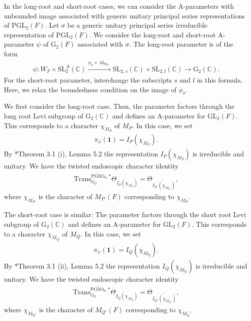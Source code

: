 \documentclass[12pt]{amsart}
\theoremstyle{definition}
\theoremstyle{plain}
\theoremstyle{remark}
\def\C{\mathbb{C}}%
\def\GL{\mathrm{GL}}
\def\PGL{\mathrm{PGL}}
\def\SL{\mathrm{SL}}
\def\PGSO{\mathrm{PGSO}}
\DeclareMathOperator{\id}{id}%
\numberwithin{equation}{section}
\newcommand{\rG}{\mathrm{G}}
\newcommand{\Trans}{\mathrm{Trans}}
\begin{document}
In the long-root and short-root cases, we can consider the A-parameters with unbounded image associated with generic unitary principal series representations of $\PGL_2(F)$.
Let $\sigma$ be a generic unitary principal series irreducible representation of $\PGL_2(F)$.
We consider the long-root and short-root A-parameter $\psi$ of $\rG_2(F)$ associated with $\sigma$.
The long-root parameter is of the form
\begin{align*}
      \psi \colon W_F \times \SL_2^A(\C) \xrightarrow{\phi_{\sigma} \times \id_{\SL_2}} \SL_{2, s}(\C) \times \SL_{2, l}(\C) \to \rG_2(\C).
\end{align*}
For the short-root parameter, interchange the subscripts $s$ and $l$
in this formula.
Here, we relax the boundedness condition on the image of $\phi_{\sigma}$.

We first consider the long-root case.
Then, the parameter factors through the long root Levi subgroup of $\rG_2(\C)$ and defines an A-parameter for $\GL_2(F)$.
This corresponds to a character $\chi_{M_P}$ of $M_P$.
In this case, we set 
\begin{align*}
      \pi_{\psi}(\mathbf{1}) = I_P(\chi_{M_P}).
\end{align*}
By \cite{Muic1997-UnitaryDualG2}*{Theorem 3.1 (i), Lemma 5.2} the representation $I_P(\chi_{M_P})$ is irreducible and unitary.
We have the twisted endoscopic character identity
\begin{align*}
      \Trans^{\widetilde{\PGSO_8}, *}_{\rG_2} \Theta_{I_P(\chi_{M_P})} = \Theta_{\widetilde{I_{P'}(\chi_{M_{P'}})}},
\end{align*}
where $\chi_{M_{P'}}$ is the character of $M_{P'}(F)$ corresponding to $\chi_{M_P}$.

The short-root case is similar:
The parameter factors through the short root Levi subgroup of $\rG_2(\C)$ and defines an A-parameter for $\GL_2(F)$.
This corresponds to a character $\chi_{M_Q}$ of $M_Q$.
In this case, we set
\begin{align*}
      \pi_{\psi}(\mathbf{1}) = I_Q(\chi_{M_Q}).
\end{align*}
By \cite{Muic1997-UnitaryDualG2}*{Theorem 3.1 (ii), Lemma 5.2} the representation $I_Q(\chi_{M_Q})$ is irreducible and unitary.
We have the twisted endoscopic character identity
\begin{align*}
      \Trans^{\widetilde{\PGSO_8}, *}_{\rG_2} \Theta_{I_Q(\chi_{M_Q})} = \Theta_{\widetilde{I_{Q'}(\chi_{M_{Q'}})}},
\end{align*}
where $\chi_{M_{Q'}}$ is the character of $M_{Q'}(F)$ corresponding to $\chi_{M_Q}$.
\end{document}
